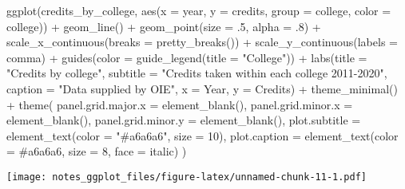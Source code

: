 \documentclass[
]{book}
\newenvironment{Shaded}{\begin{snugshade}}{\end{snugshade}}
\newcommand{\AttributeTok}[1]{\textcolor[rgb]{0.77,0.63,0.00}{#1}}
\newcommand{\DecValTok}[1]{\textcolor[rgb]{0.00,0.00,0.81}{#1}}
\newcommand{\FunctionTok}[1]{\textcolor[rgb]{0.00,0.00,0.00}{#1}}
\newcommand{\NormalTok}[1]{#1}
\newcommand{\SpecialCharTok}[1]{\textcolor[rgb]{0.00,0.00,0.00}{#1}}
\newcommand{\StringTok}[1]{\textcolor[rgb]{0.31,0.60,0.02}{#1}}
\begin{document}
\begin{Shaded}
\begin{Highlighting}[]
\FunctionTok{ggplot}\NormalTok{(credits\_by\_college, }\FunctionTok{aes}\NormalTok{(}\AttributeTok{x =}\NormalTok{ year, }\AttributeTok{y =}\NormalTok{ credits, }\AttributeTok{group =}\NormalTok{ college, }\AttributeTok{color =}\NormalTok{ college)) }\SpecialCharTok{+} 
  \FunctionTok{geom\_line}\NormalTok{() }\SpecialCharTok{+} \FunctionTok{geom\_point}\NormalTok{(}\AttributeTok{size =}\NormalTok{ .}\DecValTok{5}\NormalTok{, }\AttributeTok{alpha =}\NormalTok{ .}\DecValTok{8}\NormalTok{) }\SpecialCharTok{+}
  \FunctionTok{scale\_x\_continuous}\NormalTok{(}\AttributeTok{breaks =} \FunctionTok{pretty\_breaks}\NormalTok{()) }\SpecialCharTok{+}
  \FunctionTok{scale\_y\_continuous}\NormalTok{(}\AttributeTok{labels =}\NormalTok{ comma) }\SpecialCharTok{+}
  \FunctionTok{guides}\NormalTok{(}\AttributeTok{color =} \FunctionTok{guide\_legend}\NormalTok{(}\AttributeTok{title =} \StringTok{"College"}\NormalTok{)) }\SpecialCharTok{+}
  \FunctionTok{labs}\NormalTok{(}\AttributeTok{title =} \StringTok{"Credits by college"}\NormalTok{,}
       \AttributeTok{subtitle =} \StringTok{"Credits taken within each college 2011{-}2020"}\NormalTok{,}
       \AttributeTok{caption =} \StringTok{"Data supplied by OIE"}\NormalTok{,}
       \AttributeTok{x =} \StringTok{\textquotesingle{}Year\textquotesingle{}}\NormalTok{,}
       \AttributeTok{y =} \StringTok{\textquotesingle{}Credits\textquotesingle{}}\NormalTok{) }\SpecialCharTok{+}
  \FunctionTok{theme\_minimal}\NormalTok{() }\SpecialCharTok{+}
  \FunctionTok{theme}\NormalTok{(}
    \AttributeTok{panel.grid.major.x =} \FunctionTok{element\_blank}\NormalTok{(),}
    \AttributeTok{panel.grid.minor.x =} \FunctionTok{element\_blank}\NormalTok{(),}
    \AttributeTok{panel.grid.minor.y =} \FunctionTok{element\_blank}\NormalTok{(),}
    \AttributeTok{plot.subtitle =} \FunctionTok{element\_text}\NormalTok{(}\AttributeTok{color =} \StringTok{"\#a6a6a6"}\NormalTok{, }\AttributeTok{size =} \DecValTok{10}\NormalTok{),}
    \AttributeTok{plot.caption =} \FunctionTok{element\_text}\NormalTok{(}\AttributeTok{color =} \StringTok{\textquotesingle{}\#a6a6a6\textquotesingle{}}\NormalTok{, }\AttributeTok{size =} \DecValTok{8}\NormalTok{, }\AttributeTok{face =} \StringTok{\textquotesingle{}italic\textquotesingle{}}\NormalTok{)}
\NormalTok{  )}
\end{Highlighting}
\end{Shaded}

\texttt{[image: notes\_ggplot\_files/figure-latex/unnamed-chunk-11-1.pdf]}
\end{document}
